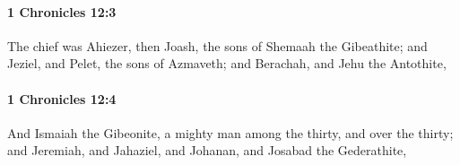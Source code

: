 		\paragraph{1 Chronicles 12:3} %
			\label{1CHRONICLES-12-3}

			The chief was Ahiezer, then Joash, the sons of Shemaah the Gibeathite; and Jeziel, and Pelet, the sons of Azmaveth; and Berachah, and Jehu the Antothite,


		\paragraph{1 Chronicles 12:4} %
			\label{1CHRONICLES-12-4}

			And Ismaiah the Gibeonite, a mighty man among the thirty, and over the thirty; and Jeremiah, and Jahaziel, and Johanan, and Josabad the Gederathite,



